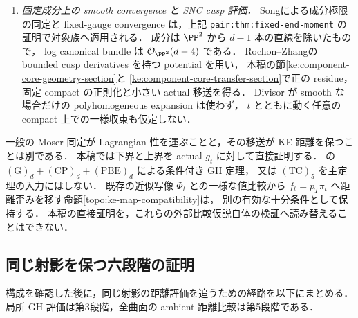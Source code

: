 \begin{enumerate}
\item \emph{固定成分上の smooth convergence と SNC cusp 評価．}
Song\cite[Theorem~1.2]{SongNegativeKE}による成分極限の同定と
fixed-gauge convergence は，上記
\texttt{pair:thm:fixed-end-moment} の証明で対象族へ適用される．
成分は $\PP^2$ から $d-1$ 本の直線を除いたもので，
log canonical bundle は $\mathcal O_{\PP^2}(d-4)$ である．
Rochon--Zhang\cite[\S5, (5.3)--(5.6), Theorem~5.1]{RochonZhang}の
bounded cusp derivatives を持つ potential を用い，
本稿の節\ref{ke:component-core-geometry-section}と
\ref{ke:component-core-transfer-section}で正の residue，
固定 compact の正則化と小さい actual 移送を得る．
Divisor が smooth な場合だけの polyhomogeneous expansion は使わず，
$t$ とともに動く任意の compact 上での一様収束も仮定しない．
\end{enumerate}

一般の Moser 同定が Lagrangian 性を運ぶことと，その移送が KE 距離を保つことは別である．
本稿では下界と上界を actual $g_t$ に対して直接証明する．
\cite{KECubicalCurrent}の
$\mathrm{(G)}_d+\mathrm{(CP)}_d+\mathrm{(PBE)}_d$ による条件付き GH 定理，
又は $\mathrm{(TC)}_5$ を主定理の入力にはしない．
既存の近似写像 $\Phi_t$ との一様な値比較から
$f_t=p_T\pi_t$ へ距離歪みを移す命題\ref{topo:ke-map-compatibility}は，
別の有効な十分条件として保持する．
本稿の直接証明を，これらの外部比較仮説自体の検証へ読み替えることはできない．

\subsection{同じ射影を保つ六段階の証明}
\label{ke:proof-route}

構成を確認した後に，同じ射影の距離評価を追うための経路を以下にまとめる．
局所 GH 評価は第3段階，全曲面の ambient 距離比較は第5段階である．

